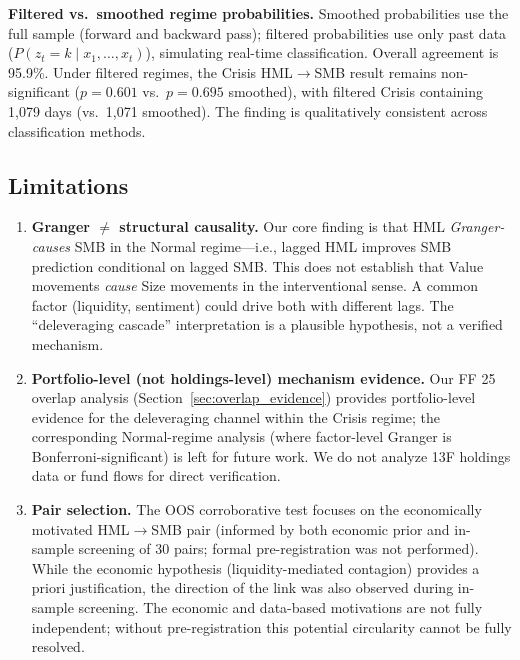 \documentclass[sigconf,anonymous]{acmart}
\begin{document}
\textbf{Filtered vs.\ smoothed regime probabilities.} Smoothed probabilities use
the full sample (forward and backward pass); filtered probabilities use only past
data ($P(z_t = k \mid x_1, \ldots, x_t)$), simulating real-time classification.
Overall agreement is 95.9\%. Under filtered regimes, the Crisis HML$\to$SMB
result remains non-significant ($p = 0.601$ vs.\ $p = 0.695$ smoothed),
with filtered Crisis containing 1,079 days (vs.\ 1,071 smoothed).
The finding is qualitatively consistent across classification methods.

\subsection{Limitations}
\label{sec:limitations}

\begin{enumerate}
    \item \textbf{Granger $\neq$ structural causality.} Our core finding is that
    HML \emph{Granger-causes} SMB in the Normal regime---i.e., lagged HML improves SMB
    prediction conditional on lagged SMB. This does not establish that Value
    movements \emph{cause} Size movements in the interventional sense. A common
    factor (liquidity, sentiment) could drive both with different lags. The
    ``deleveraging cascade'' interpretation is a plausible hypothesis, not a verified
    mechanism.

    \item \textbf{Portfolio-level (not holdings-level) mechanism evidence.}
    Our FF 25 overlap analysis (Section~\ref{sec:overlap_evidence}) provides
    portfolio-level evidence for the deleveraging channel within the Crisis regime;
    the corresponding Normal-regime analysis (where factor-level Granger is
    Bonferroni-significant) is left for future work. We do not analyze
    13F holdings data or fund flows for direct verification.

    \item \textbf{Pair selection.} The OOS corroborative test focuses on the
    economically motivated HML$\to$SMB pair (informed by both economic prior and
    in-sample screening of 30 pairs; formal pre-registration was not performed).
    While the economic hypothesis (liquidity-mediated contagion) provides a priori
    justification, the direction of the link was also observed during in-sample screening.
    The economic and data-based motivations are not fully independent; without
    pre-registration this potential circularity cannot be fully resolved.


\end{enumerate}
\end{document}
